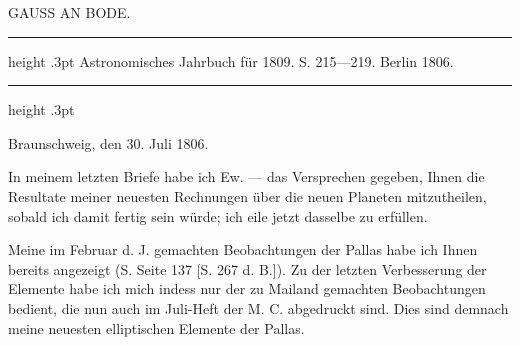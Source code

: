 \par\bigskip
{}
\hypertarget{native-283-lower}{}
\begin{center}
\large GAUSS AN BODE.
\end{center}

\begin{center}
\parbox{.79\linewidth}{%
\centering\fontsize{8.2}{10.2}\selectfont
\hrule height .3pt\relax\vspace{2.5pt}
Astronomisches Jahrbuch für 1809. S. 215—219. Berlin 1806.\par
\vspace{2.5pt}\hrule height .3pt\relax
}
\end{center}

\begin{flushright}
Braunschweig, den 30. Juli 1806.
\end{flushright}

\par\indent In meinem letzten Briefe habe ich Ew. --- das Versprechen gegeben, Ihnen die Resultate meiner
neuesten Rechnungen über die neuen Planeten mitzutheilen, sobald ich damit fertig sein würde; ich eile
jetzt dasselbe zu erfüllen.

\par\indent Meine im Februar d. J. gemachten Beobachtungen der Pallas habe ich Ihnen bereits angezeigt
(S. Seite 137 [S. 267 d. B.]). Zu der letzten Verbesserung der Elemente habe ich mich indess nur der zu
Mailand gemachten Beobachtungen bedient, die nun auch im Juli-Heft der M. C. abgedruckt sind. Dies
sind demnach meine neuesten elliptischen Elemente der Pallas.

